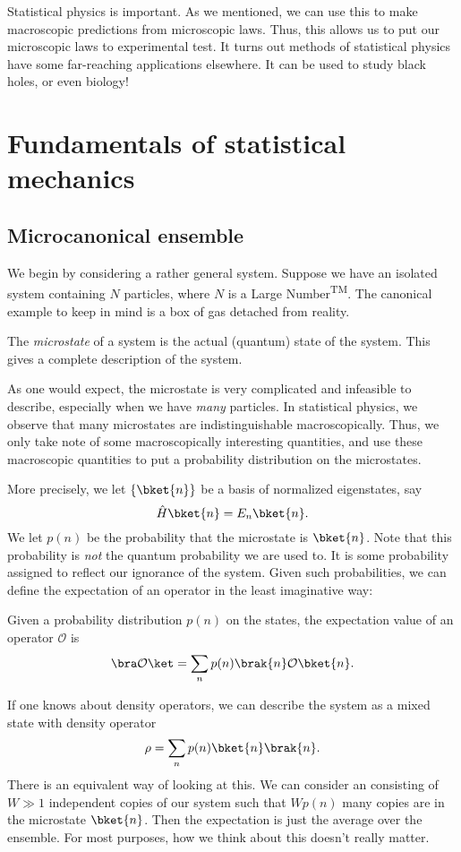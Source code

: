 \documentclass[a4paper]{article}
\begin{document}
Statistical physics is important. As we mentioned, we can use this to make macroscopic predictions from microscopic laws. Thus, this allows us to put our microscopic laws to experimental test. It turns out methods of statistical physics have some far-reaching applications elsewhere. It can be used to study black holes, or even biology!

\section{Fundamentals of statistical mechanics}
\subsection{Microcanonical ensemble}
We begin by considering a rather general system. Suppose we have an isolated system containing $N$ particles, where $N$ is a Large Number\textsuperscript{TM}. The canonical example to keep in mind is a box of gas detached from reality.

\begin{defi}[Microstate]
  The \emph{microstate} of a system is the actual (quantum) state of the system. This gives a complete description of the system.
\end{defi}

As one would expect, the microstate is very complicated and infeasible to describe, especially when we have \emph{many} particles. In statistical physics, we observe that many microstates are indistinguishable macroscopically. Thus, we only take note of some macroscopically interesting quantities, and use these macroscopic quantities to put a probability distribution on the microstates.

More precisely, we let $\{\bket{n}\}$ be a basis of normalized eigenstates, say
\[
  \hat{H}\bket{n} = E_n \bket{n}.
\]
We let $p(n)$ be the probability that the microstate is $\bket{n}$. Note that this probability is \emph{not} the quantum probability we are used to. It is some probability assigned to reflect our ignorance of the system. Given such probabilities, we can define the expectation of an operator in the least imaginative way:
\begin{defi}
  Given a probability distribution $p(n)$ on the states, the expectation value of an operator $\mathcal{O}$ is
  \[
    \bra \mathcal{O}\ket = \sum_n p(n) \brak{n}\mathcal{O}\bket{n}.
  \]
\end{defi}
If one knows about density operators, we can describe the system as a mixed state with density operator
\[
  \rho = \sum_n p(n) \bket{n}\brak{n}.
\]
There is an equivalent way of looking at this. We can consider an  consisting of $W \gg 1$ independent copies of our system such that $Wp(n)$ many copies are in the microstate $\bket{n}$. Then the expectation is just the average over the ensemble. For most purposes, how we think about this doesn't really matter.
\end{document}
